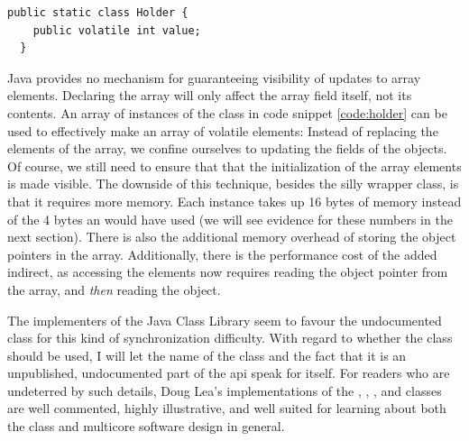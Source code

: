 \begin{code}
\begin{Verbatim}[frame=single]
  public static class Holder {
    public volatile int value;
  }
\end{Verbatim}
	\caption{}
	\label{code:holder}
\end{code}

Java provides no mechanism for guaranteeing visibility of updates to array
elements. Declaring the array  will only affect the array field
itself, not its contents. An array of instances of the  class in
code snippet \ref{code:holder} can be used to effectively make an array of
volatile elements: Instead of replacing the elements of the array, we confine
ourselves to updating the   fields of the
 objects. Of course, we still need to ensure that that the
initialization of the array elements is made visible. The downside of this
technique, besides the silly wrapper class, is that it requires more memory.
Each  instance takes up 16 bytes of memory instead of the 4 bytes
an  would have used (we will see evidence for these numbers in the
next section).
There is also the additional memory overhead of storing the object pointers in
the array. Additionally, there is the performance cost of the added indirect, as
accessing the elements now requires reading the object pointer from the array,
and \textit{then} reading the object.

The implementers of the Java Class Library seem to favour the undocumented
 class for this kind of synchronization difficulty. With
regard to whether the  class should be used, I will
let the name of the class and the fact that it is an unpublished, undocumented part
of the api speak for itself. For readers who are undeterred by such details,
Doug Lea's implementations of the  \cite{atomicintegersrc},
 \cite{atomicinterarraysrc},
 \cite{longaddersrc}, and  \cite{striped64src}
classes are well commented, highly illustrative, and well suited for learning
about both the  class and multicore software design in
general.


